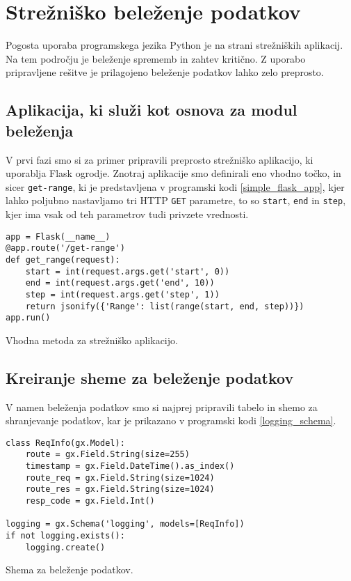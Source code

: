 \documentclass[a4paper,12pt,openright]{book}
\begin{document}
    \section{Strežniško beleženje podatkov}

    Pogosta uporaba programskega jezika Python je na strani strežniških aplikacij. Na tem področju je beleženje sprememb in zahtev kritično. Z uporabo pripravljene rešitve je prilagojeno beleženje podatkov lahko zelo preprosto.

    \subsection{Aplikacija, ki služi kot osnova za modul beleženja}

    V prvi fazi smo si za primer pripravili preprosto strežniško aplikacijo, ki uporablja Flask \cite{FLASK_GITHUB} ogrodje. Znotraj aplikacije smo definirali eno vhodno točko, in sicer {\tt get-range}, ki je predstavljena v programski kodi \ref{simple_flask_app}, kjer lahko poljubno nastavljamo tri HTTP {\tt GET} parametre, to so {\tt start}, {\tt end} in {\tt step}, kjer ima vsak od teh parametrov tudi privzete vrednosti.

\begin{code}
\begin{verbatim}
app = Flask(__name__)
@app.route('/get-range')
def get_range(request):
    start = int(request.args.get('start', 0))
    end = int(request.args.get('end', 10))
    step = int(request.args.get('step', 1))
    return jsonify({'Range': list(range(start, end, step))})
app.run()
\end{verbatim}
\caption{Vhodna metoda za strežniško aplikacijo.}
\label{simple_flask_app}
\end{code}

    \subsection{Kreiranje sheme za beleženje podatkov}

    V namen beleženja podatkov smo si najprej pripravili tabelo in shemo za shranjevanje podatkov, kar je prikazano v programski kodi \ref{logging_schema}.

\begin{code}
\begin{verbatim}
class ReqInfo(gx.Model):
    route = gx.Field.String(size=255)
    timestamp = gx.Field.DateTime().as_index()
    route_req = gx.Field.String(size=1024)
    route_res = gx.Field.String(size=1024)
    resp_code = gx.Field.Int()

logging = gx.Schema('logging', models=[ReqInfo])
if not logging.exists():
    logging.create()
\end{verbatim}
\caption{Shema za beleženje podatkov.}
\label{logging_schema}
\end{code}
\end{document}
